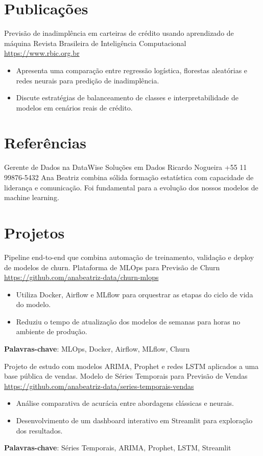 \documentclass[a4paper, serif, 10pt]{moderncv}
\begin{document}
\section{Publicações}

        {Previsão de inadimplência em carteiras de crédito usando aprendizado de máquina}
        {Revista Brasileira de Inteligência Computacional}
        {\url{https://www.rbic.org.br}}
        {}
        {\begin{itemize}
\item Apresenta uma comparação entre regressão logística, florestas aleatórias e redes neurais para predição de inadimplência.
\item Discute estratégias de balanceamento de classes e interpretabilidade de modelos em cenários reais de crédito.
\end{itemize}}
\section{Referências}

        {Gerente de Dados na DataWise Soluções em Dados}
        {Ricardo Nogueira}
        {+55 11 99876-5432}
        {}
        {Ana Beatriz combina sólida formação estatística com capacidade de liderança e comunicação. Foi fundamental para a evolução dos nossos modelos de machine learning.}
\section{Projetos}

        {Pipeline end-to-end que combina automação de treinamento, validação e deploy de modelos de churn.}
        {Plataforma de MLOps para Previsão de Churn}
        {\url{https://github.com/anabeatriz-data/churn-mlops}}
        {}
        {\begin{itemize}
\item Utiliza Docker, Airflow e MLflow para orquestrar as etapas do ciclo de vida do modelo.
\item Reduziu o tempo de atualização dos modelos de semanas para horas no ambiente de produção.
\end{itemize}
\textbf{Palavras-chave}: MLOps, Docker, Airflow, MLflow, Churn}

        {Projeto de estudo com modelos ARIMA, Prophet e redes LSTM aplicados a uma base pública de vendas.}
        {Modelo de Séries Temporais para Previsão de Vendas}
        {\url{https://github.com/anabeatriz-data/series-temporais-vendas}}
        {}
        {\begin{itemize}
\item Análise comparativa de acurácia entre abordagens clássicas e neurais.
\item Desenvolvimento de um dashboard interativo em Streamlit para exploração dos resultados.
\end{itemize}
\textbf{Palavras-chave}: Séries Temporais, ARIMA, Prophet, LSTM, Streamlit}
\end{document}
